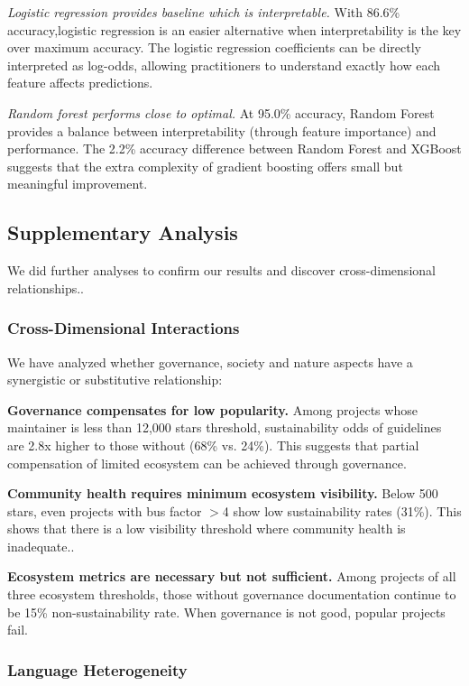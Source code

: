\documentclass[conference]{IEEEtran}
\begin{document}
\textit{Logistic regression provides baseline which is interpretable.} With 86.6\% accuracy,logistic regression is an easier alternative
when interpretability is the key over maximum accuracy. The logistic regression coefficients can be directly interpreted as log-odds, allowing practitioners to understand exactly how each feature affects predictions.

\textit{Random forest performs close to optimal.} At 95.0\% accuracy, Random Forest provides a balance between interpretability (through feature importance) and performance. The 2.2\% accuracy difference between Random Forest and XGBoost suggests that the extra complexity of gradient boosting offers small but meaningful improvement.

\subsection{Supplementary Analysis}

We did further analyses to confirm our results and discover cross-dimensional relationships..

\subsubsection{Cross-Dimensional Interactions}

We have analyzed whether governance, society and nature aspects have a synergistic or substitutive relationship:

\textbf{Governance compensates for low popularity.} Among projects whose maintainer is less than  12,000 stars threshold, sustainability odds of guidelines are 2.8x higher to those without (68\% vs. 24\%). This suggests that partial compensation of limited ecosystem can be achieved through governance.

\textbf{Community health requires minimum ecosystem visibility.} Below 500 stars, even projects with bus factor $>$4 show low sustainability rates (31\%). This shows that there is a low visibility threshold where community health is inadequate..

\textbf{Ecosystem metrics are necessary but not sufficient.} Among projects of all three ecosystem thresholds, those without governance documentation continue to be 15\% non-sustainability rate. When governance is not good, popular projects fail.

\subsubsection{Language Heterogeneity}
\end{document}
